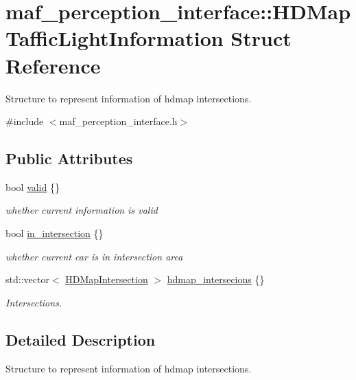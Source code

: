 \hypertarget{structmaf__perception__interface_1_1HDMapTafficLightInformation}{}\section{maf\+\_\+perception\+\_\+interface\+:\+:H\+D\+Map\+Taffic\+Light\+Information Struct Reference}
\label{structmaf__perception__interface_1_1HDMapTafficLightInformation}


Structure to represent information of hdmap intersections.  




{\ttfamily \#include $<$maf\+\_\+perception\+\_\+interface.\+h$>$}

\subsection*{Public Attributes}
\begin{DoxyCompactItemize}
\item 
bool \hyperlink{structmaf__perception__interface_1_1HDMapTafficLightInformation_a4159c53fde8a2eabed5576489dde2f78}{valid} \{\}
\begin{DoxyCompactList}\small\item\em whether current information is valid \end{DoxyCompactList}\item 
bool \hyperlink{structmaf__perception__interface_1_1HDMapTafficLightInformation_abf4c0ed95ede85afd94d9a3ac3643d78}{in\+\_\+intersection} \{\}
\begin{DoxyCompactList}\small\item\em whether current car is in intersection area \end{DoxyCompactList}\item 
std\+::vector$<$ \hyperlink{structmaf__perception__interface_1_1HDMapIntersection}{H\+D\+Map\+Intersection} $>$ \hyperlink{structmaf__perception__interface_1_1HDMapTafficLightInformation_a932c8accbf9dd9c1b02926b47db0b103}{hdmap\+\_\+intersecions} \{\}
\begin{DoxyCompactList}\small\item\em Intersections. \end{DoxyCompactList}\end{DoxyCompactItemize}


\subsection{Detailed Description}
Structure to represent information of hdmap intersections. 

